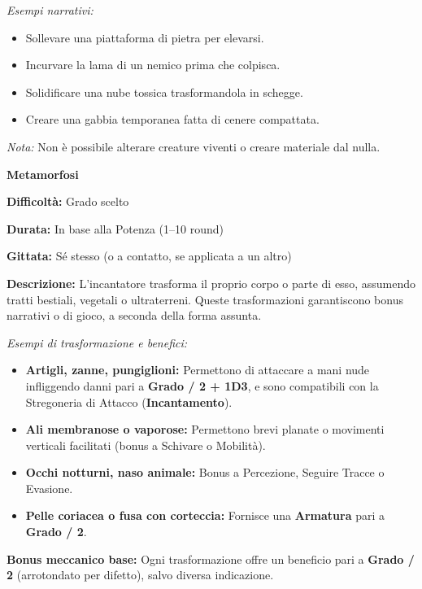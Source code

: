 \documentclass[./magie.tex]{subfiles}
\begin{document}
\textit{Esempi narrativi:}
\begin{itemize}
\item Sollevare una piattaforma di pietra per elevarsi.
\item Incurvare la lama di un nemico prima che colpisca.
\item Solidificare una nube tossica trasformandola in schegge.
\item Creare una gabbia temporanea fatta di cenere compattata.
\end{itemize}

\textit{Nota:} Non è possibile alterare creature viventi o creare materiale dal nulla.

\clearpage
{\zarafirtitlefont\Large\bfseries\noindent Metamorfosi}\\
\begin{description}
\item \textbf{Difficoltà:} Grado scelto
\item \textbf{Durata:} In base alla Potenza (1–10 round)
\item \textbf{Gittata:} Sé stesso (o a contatto, se applicata a un altro)
\item \textbf{Descrizione:} L’incantatore trasforma il proprio corpo o parte di esso, assumendo tratti bestiali, vegetali o ultraterreni. Queste trasformazioni garantiscono bonus narrativi o di gioco, a seconda della forma assunta.
\end{description}

\textit{Esempi di trasformazione e benefici:}
\begin{itemize}
\item \textbf{Artigli, zanne, pungiglioni:} Permettono di attaccare a mani nude infliggendo danni pari a \textbf{Grado / 2 + 1D3}, e sono compatibili con la Stregoneria di Attacco (\textbf{Incantamento}).
\item \textbf{Ali membranose o vaporose:} Permettono brevi planate o movimenti verticali facilitati (bonus a Schivare o Mobilità).
\item \textbf{Occhi notturni, naso animale:} Bonus a Percezione, Seguire Tracce o Evasione.
\item \textbf{Pelle coriacea o fusa con corteccia:} Fornisce una \textbf{Armatura} pari a \textbf{Grado / 2}.
\end{itemize}

\textbf{Bonus meccanico base:} Ogni trasformazione offre un beneficio pari a \textbf{Grado / 2} (arrotondato per difetto), salvo diversa indicazione.
\end{document}
